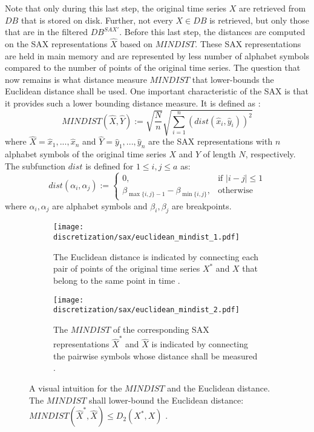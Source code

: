Note that only during this last step, the original time series $X$ are retrieved from $DB$ that is stored on disk. Further, not every $X \in DB$ is retrieved, but only those that are in the filtered $DB^{SAX'}$. Before this last step, the distances are computed on the \ac{SAX} representations $\hat{X}$ based on $MINDIST$. These \ac{SAX} representations are held in main memory and are represented by less number of alphabet symbols compared to the number of points of the original time series. \newline
The question that now remains is what distance measure $MINDIST$ that lower-bounds the Euclidean distance shall be used. One important characteristic of the \ac{SAX} is that it provides such a lower bounding distance measure. It is defined as \cite{SAX_Lin}:
\begin{equation}
MINDIST(\hat{X},\hat{Y}) := \sqrt{\frac{N}{n}}\sqrt{\sum_{i=1}^{n} (dist(\hat{x}_i, \hat{y}_i))^2}
\label{eq:mindist}
\end{equation}
where $\hat{X} = \hat{x}_1, ..., \hat{x}_n$ and $\hat{Y} = \hat{y}_1, ..., \hat{y}_n$ are the \ac{SAX} representations with $n$ alphabet symbols of the original time series $X$ and $Y$ of length $N$, respectively. The subfunction $dist$ is defined for $1 \leq i,j \leq a$ as:
\begin{equation}
dist(\alpha_i, \alpha_j) :=
\begin{cases}
0, & \text{if } |i - j| \leq 1 \\
\beta_{\max \{i,j\}-1} - \beta_{\min \{i,j\}}, & \text{otherwise}
\end{cases}
\label{eq:dist}
\end{equation}
where $\alpha_i, \alpha_j$ are alphabet symbols and $\beta_i, \beta_j$ are breakpoints.
\begin{figure}[htb]
\centering
\begin{subfigure}[t]{0.8\textwidth}
\texttt{[image: discretization/sax/euclidean\_mindist\_1.pdf]}
\caption{The Euclidean distance is indicated by connecting each pair of points of the original time series $X^*$ and $X$ that belong to the same point in time \cite{SAX_Lin}.}
\label{fig:Euclidean_Mindist_1}
\end{subfigure}
\begin{subfigure}[t]{0.8\textwidth}
\texttt{[image: discretization/sax/euclidean\_mindist\_2.pdf]}
\caption{The $MINDIST$ of the corresponding \ac{SAX} representations $\hat{X}^*$ and $\hat{X}$ is indicated by connecting the pairwise symbols whose distance shall be measured \cite{SAX_Lin}.}
\label{fig:Euclidean_Mindist_2}
\end{subfigure}
\vspace*{0.2cm}
\caption[Symbolic Aggregate Approximation - Euclidean vs. MINDIST]{A visual intuition for the $MINDIST$ and the Euclidean distance. The $MINDIST$ shall lower-bound the Euclidean distance: $MINDIST(\hat{X}^*, \hat{X}) \leq D_2(X^*, X)$ \cite{SAX_Lin}.}
\label{fig:Euclidean_Mindist}
\end{figure}
